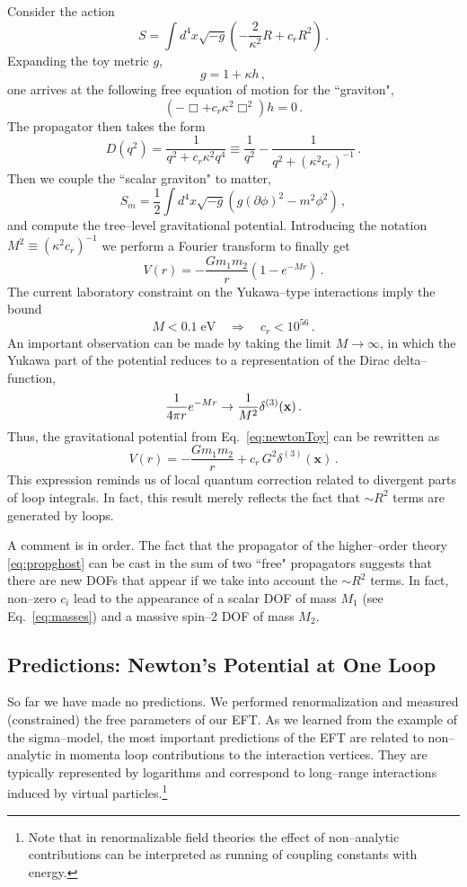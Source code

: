 \documentclass[12pt]{article}
\newcommand{\be}{\begin{equation}}
\newcommand{\ee}{\end{equation}}
\def\d{\partial}
\begin{document}
Consider the action
\be
S=\int d^4x \sqrt{-g}\left(
-\frac{2}{\kappa^2}R+c_r R^2
\right)\,.
\ee
Expanding the toy metric $g$,
\be
g=1+\kappa h\,,
\ee
one arrives at the following free equation of motion for the ``graviton",
\be
(-\Box+c_r\kappa^2 \Box^2)h=0\,.
\ee
The propagator then takes the form
\be
\label{eq:propghost}
D(q^2)= \frac{1}{q^2+c_r\kappa^2 q^4}\equiv \frac{1}{q^2}-\frac{1}{q^2+(\kappa^2 c_r)^{-1}}\,.
\ee
Then we couple the ``scalar graviton" to matter,
\be
S_m=\frac{1}{2}\int d^4x \sqrt{-g}\left(
g(\d\phi)^2-m^2\phi^2
\right)\,,
\ee
and compute the tree--level gravitational potential.
Introducing the notation $M^2\equiv (\kappa^2 c_r)^{-1}$ we perform a Fourier transform to finally get
\be
\label{eq:newtonToy}
V(r)=-\frac{G m_1 m_2}{r}(1-e^{-Mr})\,.
\ee
The current laboratory constraint on the Yukawa--type interactions imply the bound
\be
M < 0.1 \;\text{eV} \quad \Rightarrow \quad c_r< 10^{56}\,.
\ee
An important observation can be made by taking the limit $M\to \infty$,
in which the Yukawa part of the potential reduces to a representation of the Dirac delta--function,
\be
\frac{1}{4\pi r} e^{-M r} \to \frac{1}{M^2}\delta^{(3)}({\bf x})\,.
\ee
Thus, the gravitational potential from Eq.~\eqref{eq:newtonToy} can be rewritten as
\be
 V(r)=-\frac{G m_1 m_2}{r}+c_r\, G^2\delta^{(3)}(\textbf{x})\,.
\ee
This expression reminds us of local quantum correction related to divergent parts of loop integrals.
In fact, this result merely reflects the fact that $\sim R^2$ terms are generated by loops.

A comment is in order. The fact that the propagator of the higher--order theory \eqref{eq:propghost}
can be cast in the sum of two ``free" propagators suggests that there are new DOFs that appear if we take into account the $\sim R^2$ terms.
In fact, non--zero $c_i$ lead to the appearance of a scalar DOF of mass
$M_1$ (see Eq.~\eqref{eq:masses}) and a massive spin--2 DOF of mass $M_2$.

\subsection{Predictions: Newton's Potential at One Loop}

So far we have made no predictions.
We performed renormalization and measured (constrained) the free parameters of our EFT.
As we learned from the example of the sigma--model, the most important predictions of the EFT
are related to non--analytic in momenta loop contributions to the interaction vertices.
They are typically represented by logarithms and correspond to long--range interactions induced by
virtual particles.\footnote{
Note that in renormalizable field theories
the effect of non--analytic
contributions can be interpreted as running of coupling constants with energy.
}
\end{document}
